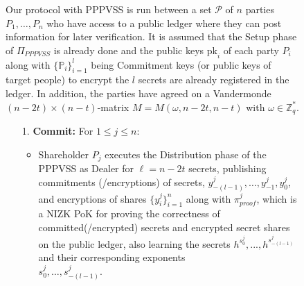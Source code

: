 \begin{figure}[ht]
    \centering
    \begin{tcolorbox}[title=\textbf{Randomness Beacon using PPPVSS}, width=0.9\textwidth, colframe=blue!75!black, colback=blue!10, sharp corners]
        Our protocol with PPPVSS is run between a set $\mathcal{P}$ of $n$ 
        parties $P_1, \dots, P_n$ who have access to a public ledger where they 
        can post information for later verification. It is assumed that the 
        Setup phase of $\Pi_{PPPVSS}$ is already done and the public keys 
        $\text{pk}_i$ of each party $P_i$ along with $\{\mathbb{P}_i\}_{i=1}^{l}$ 
        being Commitment keys (or public keys of target people) to encrypt the 
        $l$ secrets are already registered in the ledger. In addition, the 
        parties have agreed on a Vandermonde $(n - 2t) \times (n - t)$-matrix 
        $M = M(\omega, n - 2t, n - t)$ with $\omega \in \mathbb{Z}_q^*$.

    \begin{enumerate}
        \item [1.]\textbf{Commit:} For $1 \leq j \leq n$:
        \begin{itemize}
            \item Shareholder $P_j$ executes the Distribution phase of the 
            PPPVSS as Dealer for $\ell = n - 2t$ secrets, publishing commitments 
            (/encryptions) of secrets, $y_{-(l-1)}^j, \dots, y_{-1}^j, y_0^j$, 
            and encryptions of shares $\{y_i^j\}_{i=1}^n$ along with 
            $\pi_{proof}^{j}$, which is a NIZK PoK for proving the correctness of 
            committed(/encrypted) secrets and encrypted secret shares on the 
            public ledger, also learning the secrets $h^{s_0^j},...,h^{s_{-(l-1)}^j}$ 
            and their corresponding exponents\\ $s_0^j, \dots, s_{-(l-1)}^j$.
        \end{itemize}
        

\end{enumerate}
\end{tcolorbox}
\end{figure}
